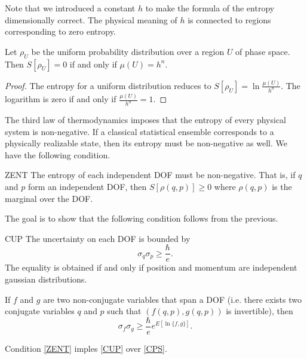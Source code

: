 \documentclass{techbrief}
\begin{document}
Note that we introduced a constant $h$ to make the formula of the entropy dimensionally correct. The physical meaning of $h$ is connected to regions corresponding to zero entropy.

\begin{coro}
	Let $\rho_U$ be the uniform probability distribution over a region $U$ of phase space. Then $S[\rho_U] = 0$ if and only if $\mu(U) = h^n$.
\end{coro}

\begin{proof}
	The entropy for a uniform distribution reduces to $S[\rho_U] = \ln \frac{\mu(U)}{h^n}$. The logarithm is zero if and only if $\frac{\mu(U)}{h^n} = 1$.
\end{proof}

The third law of thermodynamics imposes that the entropy of every physical system is non-negative. If a classical statistical ensemble corresponds to a physically realizable state, then its entropy must be non-negative as well. We have the following condition.

\begin{condition}{ZENT}
	The entropy of each independent DOF must be non-negative. That is, if $q$ and $p$ form an independent DOF, then $S[\rho(q,p)] \geq 0$ where $\rho(q,p)$ is the marginal over the DOF.
\end{condition}

The goal is to show that the following condition follows from the previous.

\begin{condition}{CUP}
	The uncertainty on each DOF is bounded by
	$$ \sigma_q \sigma_p \geq \frac{\hbar}{e}. $$
	The equality is obtained if and only if position and momentum are independent gaussian distributions.
	
	If $f$ and $g$ are two non-conjugate variables that span a DOF (i.e. there exists two conjugate variables $q$ and $p$ such that $(f(q,p), g(q,p))$ is invertible), then
	$$ \sigma_f \sigma_g \geq \frac{\hbar}{e} e^{E[\ln \{f,g\}]}.$$
\end{condition}

\begin{claim}
	Condition \ref{ZENT} imples \ref{CUP} over \ref{CPS}.
\end{claim}
\end{document}
